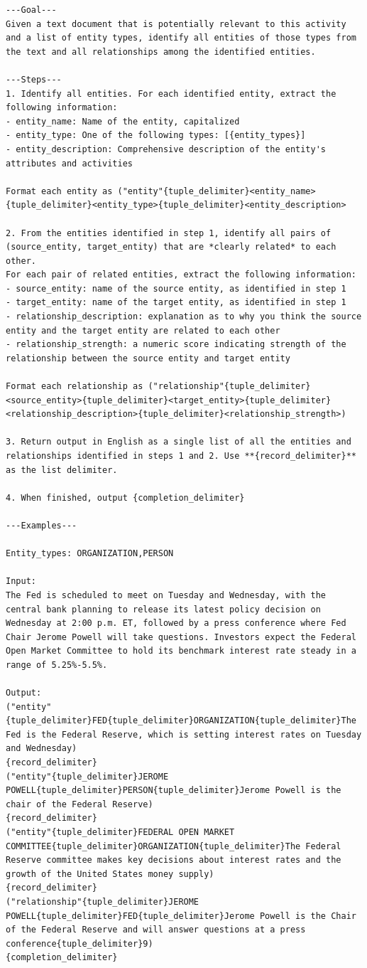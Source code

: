 \documentclass[11pt,UTF8,fontset=fandol]{ctexart}
\begin{document}
\begin{lstlisting}[style=promptstyle]
---Goal---
Given a text document that is potentially relevant to this activity and a list of entity types, identify all entities of those types from the text and all relationships among the identified entities.

---Steps---
1. Identify all entities. For each identified entity, extract the following information:
- entity_name: Name of the entity, capitalized
- entity_type: One of the following types: [{entity_types}]
- entity_description: Comprehensive description of the entity's attributes and activities

Format each entity as ("entity"{tuple_delimiter}<entity_name>{tuple_delimiter}<entity_type>{tuple_delimiter}<entity_description>

2. From the entities identified in step 1, identify all pairs of (source_entity, target_entity) that are *clearly related* to each other.
For each pair of related entities, extract the following information:
- source_entity: name of the source entity, as identified in step 1
- target_entity: name of the target entity, as identified in step 1
- relationship_description: explanation as to why you think the source entity and the target entity are related to each other
- relationship_strength: a numeric score indicating strength of the relationship between the source entity and target entity

Format each relationship as ("relationship"{tuple_delimiter}<source_entity>{tuple_delimiter}<target_entity>{tuple_delimiter}<relationship_description>{tuple_delimiter}<relationship_strength>)

3. Return output in English as a single list of all the entities and relationships identified in steps 1 and 2. Use **{record_delimiter}** as the list delimiter.

4. When finished, output {completion_delimiter}

---Examples---

Entity_types: ORGANIZATION,PERSON

Input:
The Fed is scheduled to meet on Tuesday and Wednesday, with the central bank planning to release its latest policy decision on Wednesday at 2:00 p.m. ET, followed by a press conference where Fed Chair Jerome Powell will take questions. Investors expect the Federal Open Market Committee to hold its benchmark interest rate steady in a range of 5.25%-5.5%.

Output:
("entity"{tuple_delimiter}FED{tuple_delimiter}ORGANIZATION{tuple_delimiter}The Fed is the Federal Reserve, which is setting interest rates on Tuesday and Wednesday)
{record_delimiter}
("entity"{tuple_delimiter}JEROME POWELL{tuple_delimiter}PERSON{tuple_delimiter}Jerome Powell is the chair of the Federal Reserve)
{record_delimiter}
("entity"{tuple_delimiter}FEDERAL OPEN MARKET COMMITTEE{tuple_delimiter}ORGANIZATION{tuple_delimiter}The Federal Reserve committee makes key decisions about interest rates and the growth of the United States money supply)
{record_delimiter}
("relationship"{tuple_delimiter}JEROME POWELL{tuple_delimiter}FED{tuple_delimiter}Jerome Powell is the Chair of the Federal Reserve and will answer questions at a press conference{tuple_delimiter}9)
{completion_delimiter}


\end{lstlisting}
\end{document}
